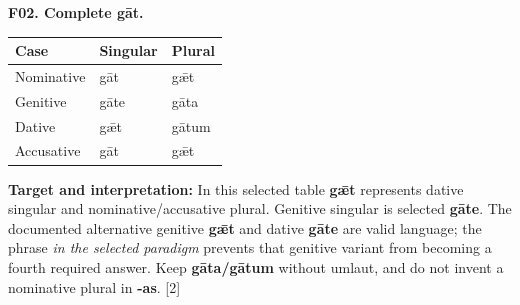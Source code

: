 \par\begin{minipage}{\linewidth}\raggedright
\textbf{F02. Complete gāt.}

\par\begingroup
\fontsize{10.5}{13.2}\selectfont
\setlength{\LTleft}{0pt}\setlength{\LTright}{\fill}
\noindent
\begin{tabular}{@{}>{\raggedright\arraybackslash}p{39.46mm}>{\raggedright\arraybackslash}p{39.46mm}>{\raggedright\arraybackslash}p{39.46mm}@{}}
\toprule
\textbf{Case} & \textbf{Singular} & \textbf{Plural} \\
\midrule
Nominative & gāt & gǣt \\
Genitive & gāte & gāta \\
Dative & gǣt & gātum \\
Accusative & gāt & gǣt \\
\bottomrule
\end{tabular}
\par\endgroup

\textbf{Target and interpretation:} In this selected table \textbf{gǣt} represents dative singular and nominative/\allowbreak{}accusative plural. Genitive singular is selected \textbf{gāte}. The documented alternative genitive \textbf{gǣt} and dative \textbf{gāte} are valid language; the phrase \emph{in the selected paradigm} prevents that genitive variant from becoming a fourth required answer. Keep \textbf{gāta/\allowbreak{}gātum} without umlaut, and do not invent a nominative plural in \textbf{-as}. [2]

\end{minipage}\par\addvspace{4pt}

